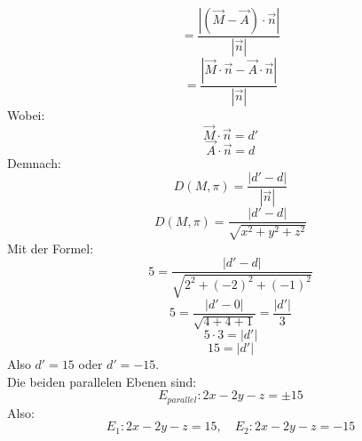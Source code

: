 \documentclass{article}
\begin{document}
\[=\frac{\left|\left(\overrightarrow{M}-\overrightarrow{A}\right)\cdot \vec{n}\right|}{\left|\vec{n}\right|}\]
\[=\frac{\left|\overrightarrow{M}\cdot \vec{n}-\overrightarrow{A}\cdot \vec{n}\right|}{\left|\vec{n}\right|}\]
Wobei:
\[\overrightarrow{M}\cdot \vec{n}=d'\]
\[\overrightarrow{A}\cdot \vec{n}=d\]
Demnach:
\[D\left(M,\pi \right)=\frac{\left|d'-d\right|}{\left|\vec{n}\right|}\]
\[D\left(M,\pi \right)=\frac{\left|d'-d\right|}{\sqrt{x^2+y^2+z^2}}\]
Mit der Formel:
\[5=\frac{|d'-d|}{\sqrt{2^2+(-2)^2+(-1)^2}}\]
\[5=\frac{|d'-0|}{\sqrt{4+4+1}}=\frac{|d'|}{3}\]
\[5\cdot 3=|d'|\]
\[15=|d'|\]
Also \(d'=15\) oder \(d'=-15\). \\
Die beiden parallelen Ebenen sind:
\[E_{parallel}: 2x-2y-z=\pm 15\]
Also:
\[E_{1}: 2x-2y-z=15,\quad E_{2}: 2x-2y-z=-15\]
\end{document}
